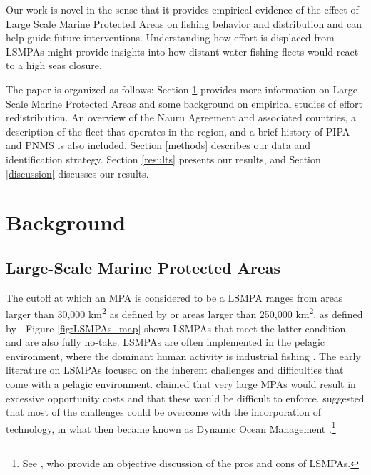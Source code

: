 \documentclass[9p,twocolumn,twoside,lineno]{pnas-new}
\begin{document}
Our work is novel in the sense that it provides empirical evidence of
the effect of Large Scale Marine Protected Areas on fishing behavior and
distribution and can help guide future interventions. Understanding how
effort is displaced from LSMPAs might provide insights into how distant water fishing fleets would react to a high seas closure.

The paper is organized as follows: Section \ref{background} provides more
information on Large Scale Marine Protected Areas and some background on
empirical studies of effort redistribution. An overview of the Nauru
Agreement and associated countries, a description of the fleet that
operates in the region, and a brief history of PIPA and PNMS is also included.
Section \ref{methods} describes our data and identification strategy.
Section \ref{results} presents our results, and Section \ref{discussion}
discusses our
results.

\section{Background}\label{background}

\subsection{Large-Scale Marine Protected Areas}\label{lsmpas}

The cutoff at which an MPA is considered to be a LSMPA ranges from areas
larger than 30,000 km\textsuperscript{2} as defined by
\cite{desanto_2013} or areas larger than 250,000 km\textsuperscript{2},
as defined by \cite{toonen_2013}. Figure \ref{fig:LSMPAs_map} shows
LSMPAs that meet the latter condition, and are also fully no-take. LSMPAs are often
implemented in the pelagic environment, where the dominant human
activity is industrial fishing \cite{gray_2017,kroodsma_2018}. The
early literature on LSMPAs focused on the inherent challenges and
difficulties that come with a pelagic environment. \cite{kaplan_2010}
claimed that very large MPAs would result in excessive opportunity costs
and that these would be difficult to enforce. \cite{game_2009}
suggested that most of the challenges could be overcome with the
incorporation of technology, in what then became known as Dynamic Ocean
Management \citep{maxwell_2015}.\footnote{See \cite{singleton_2014}, who provide an objective discussion of the pros and cons of LSMPAs.} 
\end{document}
